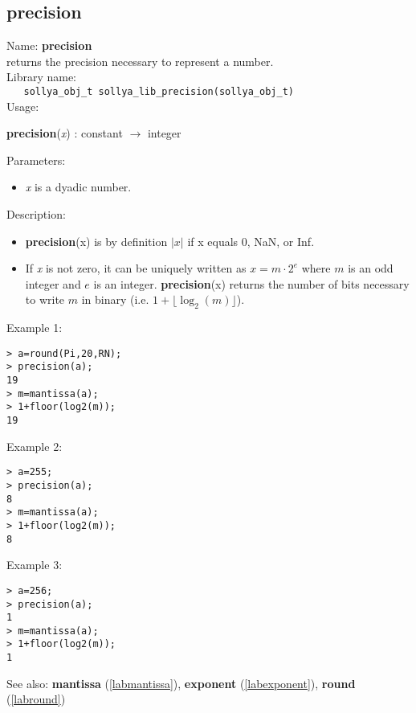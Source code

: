 \subsection{precision}
\label{labprecision}
\noindent Name: \textbf{precision}\\
\phantom{aaa}returns the precision necessary to represent a number.\\[0.2cm]
\noindent Library name:\\
\verb|   sollya_obj_t sollya_lib_precision(sollya_obj_t)|\\[0.2cm]
\noindent Usage: 
\begin{center}
\textbf{precision}(\emph{x}) : \textsf{constant} $\rightarrow$ \textsf{integer}\\
\end{center}
Parameters: 
\begin{itemize}
\item \emph{x} is a dyadic number.
\end{itemize}
\noindent Description: \begin{itemize}

\item \textbf{precision}(x) is by definition $\vert x \vert$ if x equals 0, NaN, or Inf.

\item If \emph{x} is not zero, it can be uniquely written as $x = m \cdot 2^e$ where
   $m$ is an odd integer and $e$ is an integer. \textbf{precision}(x) returns the number
   of bits necessary to write $m$ in binary (i.e. $1+ \lfloor \log_2(m) \rfloor$).
\end{itemize}
\noindent Example 1: 
\begin{center}\begin{minipage}{15cm}\begin{Verbatim}[frame=single]
> a=round(Pi,20,RN);
> precision(a);
19
> m=mantissa(a);
> 1+floor(log2(m));
19
\end{Verbatim}
\end{minipage}\end{center}
\noindent Example 2: 
\begin{center}\begin{minipage}{15cm}\begin{Verbatim}[frame=single]
> a=255;
> precision(a);
8
> m=mantissa(a);
> 1+floor(log2(m));
8
\end{Verbatim}
\end{minipage}\end{center}
\noindent Example 3: 
\begin{center}\begin{minipage}{15cm}\begin{Verbatim}[frame=single]
> a=256;
> precision(a);
1
> m=mantissa(a);
> 1+floor(log2(m));
1
\end{Verbatim}
\end{minipage}\end{center}
See also: \textbf{mantissa} (\ref{labmantissa}), \textbf{exponent} (\ref{labexponent}), \textbf{round} (\ref{labround})
